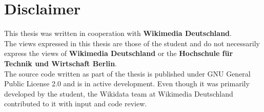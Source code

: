 \chapter*{Disclaimer}

This thesis was written in cooperation with \textbf{Wikimedia Deutschland}. \\
The views expressed in this thesis are those of the student and do not necessarily express the views of \textbf{Wikimedia Deutschland} or the \textbf{Hochschule für Technik und Wirtschaft Berlin}. \\
The source code written as part of the thesis is published under GNU General Public License 2.0 and is in active development. Even though it was primarily developed by the student, the Wikidata team at Wikimedia Deutschland contributed to it with input and code review.

